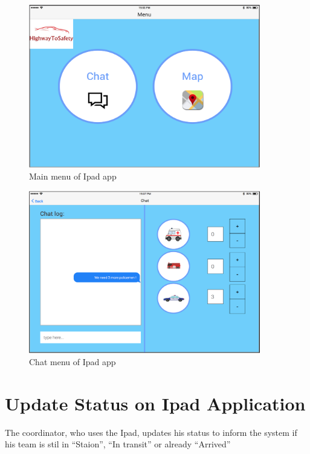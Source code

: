 \begin{minipage}{1.0\textwidth}
\begin{figure}[H]
\caption{Main menu of Ipad app}
\includegraphics[width=0.9\textwidth]{Ipad_home.eps}
\end{figure}
\end{minipage}

\begin{minipage}{1.0\textwidth}
\begin{figure}[H]
\caption{Chat menu of Ipad app}
\includegraphics[width=0.9\textwidth]{IpadChatExample.eps}
\end{figure}
\end{minipage}

\section{Update Status on Ipad Application}
\label{operation:MyOperation}
The coordinator, who uses the Ipad, updates his status to inform the system if
his team is stil in “Staion”, “In transit” or already “Arrived”

